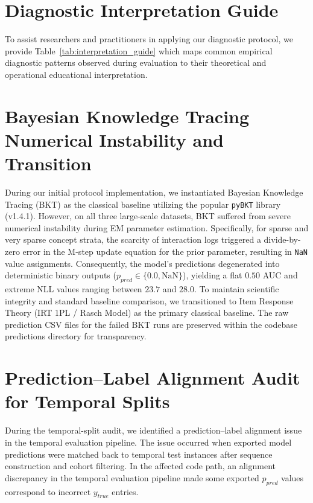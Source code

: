 

\clearpage

\section{Diagnostic Interpretation Guide}
\label{app:interpretation}
To assist researchers and practitioners in applying our diagnostic protocol, we provide Table~\ref{tab:interpretation_guide} which maps common empirical diagnostic patterns observed during evaluation to their theoretical and operational educational interpretation.



\section[Bayesian Knowledge Tracing Numerical Instability and Transition]{Bayesian Knowledge Tracing Numerical Instability and Transition}
\label{app:bkt_instability}
During our initial protocol implementation, we instantiated Bayesian Knowledge Tracing (BKT) as the classical baseline utilizing the popular \texttt{pyBKT} library (v1.4.1). However, on all three large-scale datasets, BKT suffered from severe numerical instability during EM parameter estimation. Specifically, for sparse and very sparse concept strata, the scarcity of interaction logs triggered a divide-by-zero error in the M-step update equation for the prior parameter, resulting in \texttt{NaN} value assignments. Consequently, the model's predictions degenerated into deterministic binary outputs ($p_{pred} \in \{0.0, \text{NaN}\}$), yielding a flat $0.50$ AUC and extreme NLL values ranging between $23.7$ and $28.0$. To maintain scientific integrity and standard baseline comparison, we transitioned to Item Response Theory (IRT 1PL / Rasch Model) as the primary classical baseline. The raw prediction CSV files for the failed BKT runs are preserved within the codebase predictions directory for transparency.

\section{Prediction--Label Alignment Audit for Temporal Splits}
\label{app:alignment}
During the temporal-split audit, we identified a prediction--label alignment issue in the temporal evaluation pipeline. The issue occurred when exported model predictions were matched back to temporal test instances after sequence construction and cohort filtering. In the affected code path, an alignment discrepancy in the temporal evaluation pipeline made some exported $p_{pred}$ values correspond to incorrect $y_{true}$ entries.

